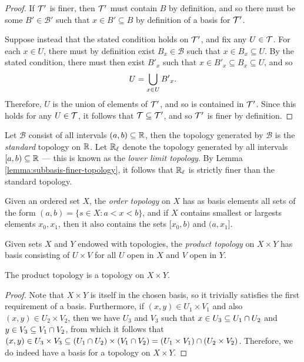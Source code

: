 \begin{proof}
    If $\mathcal{T}'$ is finer, then $\mathcal{T}'$ must contain $B$ by definition, and so there must be some $B' \in \mathcal{B}'$ such that $x \in B' \subseteq B$ by definition of a basis for $\mathcal{T}'$.

    Suppose instead that the stated condition holds on $\mathcal{T}'$, and fix any $U \in \mathcal{T}$. For each $x \in U$, there must by definition exist $B_x \in \mathcal{B}$ such that $x \in B_x \subseteq U$. By the stated condition, there must then exist ${B'}_x$ such that $x \in {B'}_x \subseteq B_x \subseteq U$, and so
    \begin{align*}
        U = \bigcup_{x\in U}{B'}_x.
    \end{align*}
    Therefore, $U$ is the union of elements of $\mathcal{T}'$, and so is contained in $\mathcal{T}'$. Since this holds for any $U \in \mathcal{T}$, it follows that $\mathcal{T} \subseteq \mathcal{T}'$, and so $\mathcal{T}'$ is finer by definition.
\end{proof}

\begin{exmp}
    Let $\mathcal{B}$ consist of all intervals $(a, b) \subseteq \mathbb{R}$, then the topology generated by $\mathcal{B}$ is the \emph{standard} topology on $\mathbb{R}$. Let $\mathbb{R}_{\ell}$ denote the topology generated by all intervals $[a, b) \subseteq \mathbb{R}$ --- this is known as the \emph{lower limit topology}. By Lemma \ref{lemma:subbasis-finer-topology}, it follows that $\mathbb{R}_{\ell}$ is strictly finer than the standard topology.
\end{exmp}

\begin{defn}
    Given an ordered set $X$, the \emph{order topology} on $X$ has as basis elements all sets of the form $(a, b) = \{s \in X : a < x < b\}$, and if $X$ contains smallest or largests elements $x_0, x_1$, then it also contains the sets $[x_0, b)$ and $(a, x_1]$.
\end{defn}

\begin{defn}
    Given sets $X$ and $Y$ endowed with topologies, the \emph{product topology} on $X \times Y$ has basis consisting of $U \times V$ for all $U$ open in $X$ and $V$ open in $Y$.
\end{defn}

\begin{prop}
    The product topology is a topology on $X \times Y$.
\end{prop}

\begin{proof}
    Note that $X \times Y$ is itself in the chosen basis, so it trivially satisfies the first requirement of a basis. Furthermore, if $(x, y) \in U_1 \times V_1$ and also $(x, y) \in U_2 \times V_2$, then we have $U_3$ and $V_3$ such that $x \in U_3 \subseteq U_1 \cap U_2$ and $y \in V_3 \subseteq V_1 \cap V_2$, from which it follows that $(x, y) \in U_3 \times V_3 \subseteq (U_1 \cap U_2) \times (V_1 \cap V_2) = (U_1 \times V_1) \cap (U_2 \times V_2)$. Therefore, we do indeed have a basis for a topology on $X \times Y$.
\end{proof}

